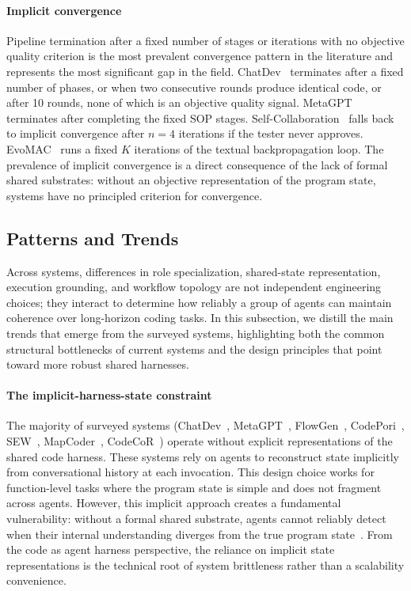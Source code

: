 \paragraph{Implicit convergence} Pipeline termination after a
fixed number of stages or iterations with no objective quality
criterion is the most prevalent convergence pattern in the
literature and represents the most significant gap in the field.
ChatDev~\cite{Qian2023ChatDev} terminates after a fixed number of
phases, or when two consecutive rounds produce identical code, or
after 10 rounds, none of which is an objective quality signal.
MetaGPT~\cite{Hong2023MetaGPT} terminates after completing the
fixed SOP stages.
Self-Collaboration~\cite{Dong2024SelfCollaboration} falls back to
implicit convergence after $n = 4$ iterations if the tester never
approves. EvoMAC~\cite{Hu2025EvoMAC} runs a fixed $K$ iterations
of the textual backpropagation loop. The prevalence of implicit
convergence is a direct consequence of the lack of formal shared
substrates: without an objective representation of the program
state, systems have no principled criterion for convergence.


\subsection{Patterns and Trends}

Across systems, differences in role specialization, shared-state representation,
execution grounding, and workflow topology are not independent
engineering choices; they interact to determine how reliably a
group of agents can maintain coherence over long-horizon coding
tasks. In this subsection, we distill the main
trends that emerge from the surveyed systems, highlighting both the common
structural bottlenecks of current systems and the design
principles that point toward more robust shared harnesses.


\paragraph{The implicit-harness-state constraint} The majority of
surveyed systems (ChatDev~\cite{Qian2023ChatDev},
MetaGPT~\cite{Hong2023MetaGPT}, FlowGen~\cite{Lin2025Soen101},
CodePori~\cite{Rasheed2024Codepori}, SEW~\cite{Liu2025SEW},
MapCoder~\cite{islam2024mapcoder},
CodeCoR~\cite{Pan2025CodeCoR}) operate without explicit
representations of the shared code harness. These systems rely on
agents to reconstruct state implicitly from conversational
history at each invocation. This design choice works for
function-level tasks where the program state is simple and does
not fragment across agents. However, this implicit approach
creates a fundamental vulnerability: without a formal shared
substrate, agents cannot reliably detect when their internal
understanding diverges from the true program
state~\cite{Guo2025SyncMind}. From the code as agent harness
perspective, the reliance on implicit state representations is
the technical root of system brittleness rather than a
scalability convenience.

